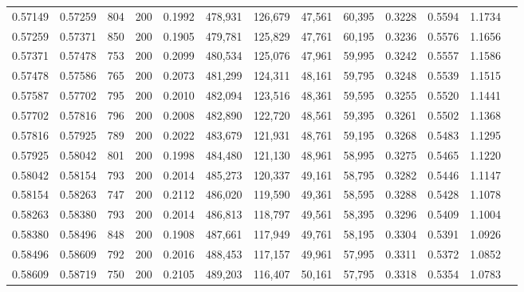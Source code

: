 \begin{tabular}{rrrrrrrrrrrrr}
0.57149 & 0.57259 &    804 & 200 &                                     0.1992 & 478,931 & 126,679 &  47,561 &  60,395 & 0.3228 & 0.5594 & 1.1734 \\
0.57259 & 0.57371 &    850 & 200 &                                     0.1905 & 479,781 & 125,829 &  47,761 &  60,195 & 0.3236 & 0.5576 & 1.1656 \\
0.57371 & 0.57478 &    753 & 200 &                                     0.2099 & 480,534 & 125,076 &  47,961 &  59,995 & 0.3242 & 0.5557 & 1.1586 \\
0.57478 & 0.57586 &    765 & 200 &                                     0.2073 & 481,299 & 124,311 &  48,161 &  59,795 & 0.3248 & 0.5539 & 1.1515 \\
0.57587 & 0.57702 &    795 & 200 &                                     0.2010 & 482,094 & 123,516 &  48,361 &  59,595 & 0.3255 & 0.5520 & 1.1441 \\
0.57702 & 0.57816 &    796 & 200 &                                     0.2008 & 482,890 & 122,720 &  48,561 &  59,395 & 0.3261 & 0.5502 & 1.1368 \\
0.57816 & 0.57925 &    789 & 200 &                                     0.2022 & 483,679 & 121,931 &  48,761 &  59,195 & 0.3268 & 0.5483 & 1.1295 \\
0.57925 & 0.58042 &    801 & 200 &                                     0.1998 & 484,480 & 121,130 &  48,961 &  58,995 & 0.3275 & 0.5465 & 1.1220 \\
0.58042 & 0.58154 &    793 & 200 &                                     0.2014 & 485,273 & 120,337 &  49,161 &  58,795 & 0.3282 & 0.5446 & 1.1147 \\
0.58154 & 0.58263 &    747 & 200 &                                     0.2112 & 486,020 & 119,590 &  49,361 &  58,595 & 0.3288 & 0.5428 & 1.1078 \\
0.58263 & 0.58380 &    793 & 200 &                                     0.2014 & 486,813 & 118,797 &  49,561 &  58,395 & 0.3296 & 0.5409 & 1.1004 \\
0.58380 & 0.58496 &    848 & 200 &                                     0.1908 & 487,661 & 117,949 &  49,761 &  58,195 & 0.3304 & 0.5391 & 1.0926 \\
0.58496 & 0.58609 &    792 & 200 &                                     0.2016 & 488,453 & 117,157 &  49,961 &  57,995 & 0.3311 & 0.5372 & 1.0852 \\
0.58609 & 0.58719 &    750 & 200 &                                     0.2105 & 489,203 & 116,407 &  50,161 &  57,795 & 0.3318 & 0.5354 & 1.0783 \\

\end{tabular}
